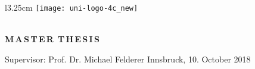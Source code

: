 
\pagestyle{empty}


\begin{titlepage}
\rule{0mm}{1mm}
\vspace*{10mm}
\begin{wrapfigure}{l}{3.25cm}
    \texttt{[image: uni-logo-4c\_new]}
\end{wrapfigure}
\begin{flushright}
    \setlength{\unitlength}{1cm}
    {\large \MOrg \vskip 5mm
    \MInstitution}\\
    \textbf{\large \MGroup}
    \vskip 15mm
    \textbf{\Large M\,A\,S\,T\,E\,R\,\,\,T\,H\,E\,S\,I\,S}
\end{flushright}

\begin{center}
    \vskip 25mm
    {\LARGE\bf \MTitle}
    \vskip 5mm
    \vskip 1cm
    {\large \textbf{\MAuthor}}\vskip 15mm
    \vskip 2cm
    {\large Supervisor: Prof. Dr. Michael Felderer}
    \vfill
    {\large Innsbruck, 10. October 2018} 
\end{center}
\end{titlepage} 

\ClearShipoutPicture
